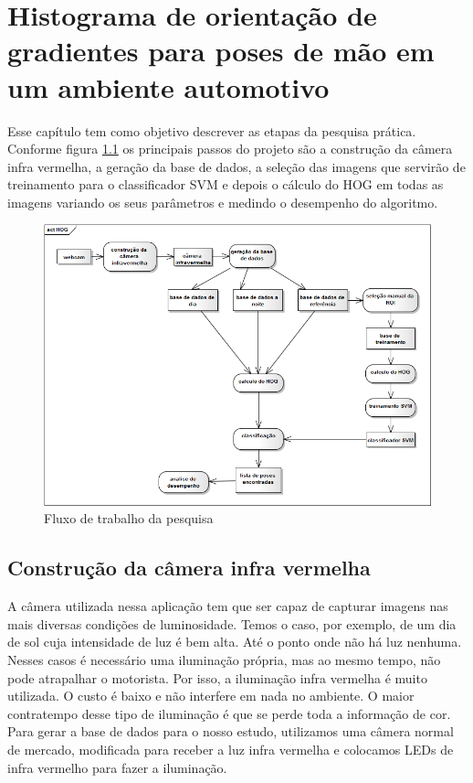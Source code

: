 \chapter{Histograma de orientação de gradientes para poses de mão em um ambiente automotivo}

Esse capítulo tem como objetivo descrever as etapas da pesquisa prática. Conforme figura \ref{fig:research_steps} os principais passos do projeto são a construção da câmera infra vermelha, a geração da base de dados, a seleção das imagens que servirão de treinamento para o classificador SVM e depois o cálculo do HOG em todas as imagens variando os seus parâmetros e medindo o desempenho do algoritmo.

\begin{figure}[ht!]
	\centering
  	\includegraphics[scale=0.6]{image/HOG.png}
  	\caption{Fluxo de trabalho da pesquisa}
  	\label{fig:research_steps}
\end{figure}

\section{Construção da câmera infra vermelha}

A câmera utilizada nessa aplicação tem que ser capaz de capturar imagens nas mais diversas condições de luminosidade. Temos o caso, por exemplo, de um dia de sol cuja intensidade de luz é bem alta. Até o ponto onde não há luz nenhuma.
Nesses casos é necessário uma iluminação própria, mas ao mesmo tempo, não pode atrapalhar o motorista. Por isso, a iluminação infra vermelha é muito utilizada. O custo é baixo e não interfere em nada no ambiente. O maior contratempo desse tipo de iluminação é que se perde toda a informação de cor.
Para gerar a base de dados para o nosso estudo, utilizamos uma câmera normal de mercado, modificada para receber a luz infra vermelha e colocamos LEDs de infra vermelho para fazer a iluminação.

